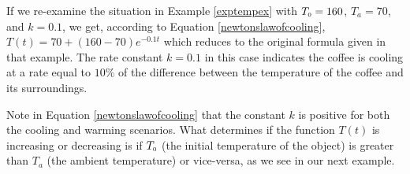 \documentclass{ximera}
\begin{document}
\smallskip 

If we re-examine the situation in Example \ref{exptempex} with $T_{\mbox{\tiny$0$}} = 160$, $T_{a} = 70$, and $k = 0.1$, we get, according to Equation \ref{newtonslawofcooling}, $T(t) = 70 + (160 - 70)e^{-0.1t}$ which reduces to the original formula given in that example.  The rate constant $k = 0.1$ in this case indicates the coffee is cooling at a rate equal to $10 \%$ of the difference between the temperature of the coffee and its surroundings.  

\smallskip

Note in Equation \ref{newtonslawofcooling} that the constant $k$ is positive for both the cooling and warming scenarios.  What determines if the function $T(t)$ is increasing or decreasing is if $T_{\mbox{\tiny$0$}}$ (the initial temperature of the object) is greater than $T_{a}$ (the ambient temperature) or vice-versa, as we see in our next example.

\smallskip
\end{document}
